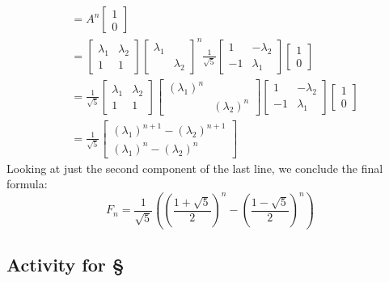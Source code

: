 \documentclass[11pt,oneside]{amsbook}
\theoremstyle{definition}
\theoremstyle{plain}
\theoremstyle{definition}
\theoremstyle{remark}
\numberwithin{equation}{section}
\numberwithin{figure}{section}
\begin{document}
\begin{itemize}
\begin{align*}
    &=A^n\begin{bmatrix}1\\0\end{bmatrix}\\
    &=\begin{bmatrix}\lambda_1&\lambda_2\\1&1\end{bmatrix}
      \begin{bmatrix}\lambda_1\\&\lambda_2\end{bmatrix}^n
      \frac{1}{\sqrt{5}}
      \begin{bmatrix}1&-\lambda_2\\
        -1&\lambda_1\end{bmatrix}
      \begin{bmatrix}1\\0\end{bmatrix}\\
    &=\frac{1}{\sqrt{5}}
      \begin{bmatrix}\lambda_1&
        \lambda_2\\1&1\end{bmatrix}
      \begin{bmatrix}(\lambda_1)^n\\
        &(\lambda_2)^n\end{bmatrix}
      \begin{bmatrix}1&-\lambda_2\\
        -1&\lambda_1\end{bmatrix}
      \begin{bmatrix}1\\0\end{bmatrix}\\
    &=\frac{1}{\sqrt{5}}
      \begin{bmatrix}
        (\lambda_1)^{n+1}-(\lambda_2)^{n+1}\\
        (\lambda_1)^n-(\lambda_2)^n
      \end{bmatrix}
  \end{align*}
  Looking at just the second component of the last line, we conclude the final formula:
  \[F_n=\frac{1}{\sqrt{5}}
    \left(\left(\frac{1+\sqrt{5}}{2}\right)^n
    -\left(\frac{1-\sqrt{5}}{2}\right)^n\right)
  \]
\end{itemize}

\newpage
\subsection*{Activity for \S \thesection}
\end{document}
